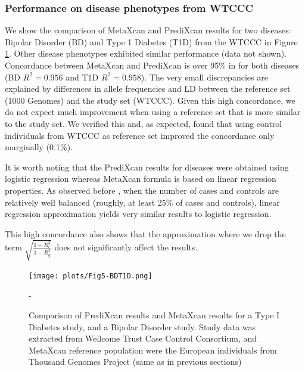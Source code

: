 \documentclass[10pt]{article}
\begin{document}
\subsubsection*{Performance on disease phenotypes from WTCCC}

We show the comparison of MetaXcan and PrediXcan results for two diseases: Bipolar Disorder (BD) and Type 1 Diabetes (T1D) from the WTCCC in Figure \ref{fig:BDT1DMP}. Other disease phenotypes exhibited similar performance (data not shown). Concordance between MetaXcan and PrediXcan is over 95\% in for both diseases (BD $R^2=0.956$ and T1D $R^2=0.958$). The very small discrepancies are explained by differences in allele frequencies and LD between the reference set (1000 Genomes) and the study set (WTCCC). Given this high concordance, we do not expect much improvement when using a reference set that is more similar to the study set. We verified this and, as expected, found that using control individuals from WTCCC as reference set improved the concordance only marginally (0.1\%).

It is worth noting that the PrediXcan results for diseases were obtained using logistic regression whereas MetaXcan formula is based on linear regression properties. As observed before \cite{Zhou2013}, when the number of cases and controls are relatively well balanced (roughly, at least 25\% of cases and controls), linear regression approximation yields very similar results to logistic regression.

This high concordance also shows that the approximation where we drop the term $\sqrt{\frac{1-R_l^2}{1-R_g^2}}$ does not significantly affect the results.

\begin{figure}
\texttt{[image: plots/Fig5-BDT1D.png]}
\caption{Comparison of PrediXcan results and MetaXcan results for a Type I Diabetes study, and a Bipolar Disorder study.
Study data was extracted from Wellcome Trust Case Control Consortium,
and MetaXcan reference population were the European individuals from Thousand Genomes Project
(same as in previous sections) }
-\label{fig:BDT1DMP}
\end{figure}

\end{document}
